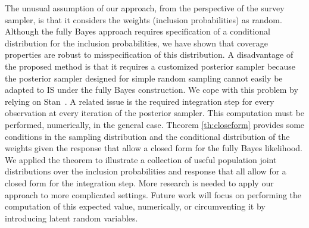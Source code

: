 \documentclass[]{imsart}
\begin{document}
The unusual assumption of our approach, from the perspective of the survey sampler, is that it considers the weights (inclusion probabilities) as random. Although the fully Bayes approach requires specification of a conditional distribution for the inclusion probabilities, we have shown that
coverage properties are robust to misspecification of this distribution.
A disadvantage of the proposed method is that it requires a customized posterior sampler because the posterior sampler designed for simple random sampling cannot easily be adapted to IS under the fully Bayes construction.
We cope with this problem by relying on Stan~\citep{carpenter2016stan}.
A related issue is the required integration step for every observation at every iteration of the posterior sampler.
This computation must be performed, numerically, in the general case. Theorem  \ref{th:closeform} provides some conditions
in the sampling distribution and the conditional distribution of the weights given the response
that allow a closed form for the fully Bayes likelihood. We applied the theorem to illustrate a collection of useful population joint distributions over the inclusion probabilities and response that all allow for a closed form for the integration step.
More research is needed to apply our approach to more complicated settings. Future work will focus on performing the computation of this expected value, numerically, or circumventing it by introducing latent random variables.
\begin{comment}
To
account for the sampling design in the estimation of the
standard error of the point estimates, the frequentist methods in the NHANES website tutorial
(\url{https://www.cdc.gov/nchs/tutorials/NHANES/SurveyDesign/SampleDesign/intro.htm})
require information on the early stages of the sampling design, which are the strata and PSU memberships for NHANES. (For confidentiality reasons masked versions of PSU and stratum are on the public release data files.)
Since the probability of the PSU selection is incorporated into the computation of the unit-level inclusion probability, $\pi_i$, the  PSU information is implicitly captured into our fully Bayesian approach (inclusion probabilities within the same PSU tend to be more similar), but the within PSU dependence may not be fully accounted for in uncertainty quantification. Future work will explore the incorporation of PSU dependence into our fully Bayesian analysis.
\end{comment}


\end{document}
